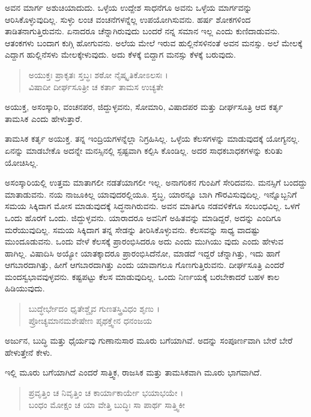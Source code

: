 ಅವನ ಮಾರ್ಗ ಅಶುಚಿಯಾದುದು. ಒಳ್ಳೆಯ ಉದ್ದೇಶ ಸಾಧನೆಗೂ ಅವನು ಒಳ್ಳೆಯ ಮಾರ್ಗವನ್ನು ಆರಿಸಿಕೊಳ್ಳುವುದಿಲ್ಲ. ಸುಳ್ಳು ಲಂಚ ವಂಚನೆಗಳನ್ನೆಲ್ಲ ಉಪಯೋಗಿಸುವನು. ಹರ್ಷ ಶೋಕಗಳಿಂದ ತಾಡಿತನಾಗುತ್ತಿರುವನು. ಏನಾದರೂ ಚೆನ್ನಾಗಿರುವುದು ಬಂದರೆ ನನ್ನ ಸಮಾನ ಇಲ್ಲ ಎಂದು ಕುಣಿದಾಡುವನು. ಆತಂಕಗಳು ಬಂದಾಗ ಕುಗ್ಗಿ ಹೋಗುವನು. ಅಲೆಯ ಮೇಲೆ ಇರುವ ಹುಲ್ಲಿನೆಸಳಿನಂತೆ ಅವನ ಮನಸ್ಸು. ಅಲೆ ಮೇಲಕ್ಕೆ ಎದ್ದಾಗ ಹುಲ್ಲಿನೆಸಳು ಮೇಲಕ್ಕೇಳುವುದು. ಅದು ಕೆಳಕ್ಕೆ ಬಿದ್ದಾಗ ಮನಸ್ಸು ಕೆಳಕ್ಕೆ ಬರುವುದು.

\begin{verse}
ಅಯುಕ್ತಃ ಪ್ರಾಕೃತಃ ಸ್ತಬ್ಧಃ ಶಠೋ ನೈಷ್ಕೃತಿಕೋಽಲಸಃ ।\\ವಿಷಾದೀ ದೀರ್ಘಸೂತ್ರೀ ಚ ಕರ್ತಾ ತಾಮಸ ಉಚ್ಯತೇ 
\end{verse}

{\small ಅಯುಕ್ತ, ಅಸಂಸ್ಕಾರಿ, ವಂಚನಪರ, ಜಿದ್ದುಳ್ಳವನು, ಸೋಮಾರಿ, ವಿಷಾದಪರ ಮತ್ತು ದೀರ್ಘಸೂತ್ರಿ ಆದ ಕರ್ತೃ ತಾಮಸಿಕ ಎಂದು ಹೇಳುತ್ತಾರೆ.}

ತಾಮಸಿಕ ಕರ್ತೃ ಅಯುಕ್ತ. ತನ್ನ ಇಂದ್ರಿಯಗಳನ್ನೆಲ್ಲಾ ನಿಗ್ರಹಿಸಿಲ್ಲ. ಒಳ್ಳೆಯ ಕೆಲಸಗಳನ್ನು ಮಾಡುವುದಕ್ಕೆ ಯೋಗ್ಯನಲ್ಲ. ಏನನ್ನು ಮಾಡಬೇಕೊ ಅದನ್ನೇ ಮನಸ್ಸಿನಲ್ಲಿ ಸ್ಪಷ್ಟವಾಗಿ ಕಲ್ಪಿಸಿ ಕೊಂಡಿಲ್ಲ. ಅದರ ಸಾಧಕಬಾಧಕಗಳನ್ನು ಕುರಿತು ಯೋಚಿಸಿಲ್ಲ.

ಅಸಂಸ್ಕಾರಿಯಲ್ಲಿ ಉತ್ತಮ ಮಾತಾಗಲೀ ನಡತೆಯಾಗಲೀ ಇಲ್ಲ. ಅನಾಗರಿಕನ ಗುಂಪಿಗೆ ಸೇರಿದವನು. ಮನಸ್ಸಿಗೆ ಬಂದದ್ದು ಮಾತಾಡುವನು. ನಯ ನಾಜೂಕಿಲ್ಲ ಯಾವುದರಲ್ಲಿಯೂ. ಸ್ತಬ್ಧ, ಯಾರನ್ನೂ ಬಾಗಿ ಗೌರವಿಸುವುದಿಲ್ಲ. ಇನ್ನೊಬ್ಬನಿಗೆ ಸಮಯ ಸಿಕ್ಕಿದಾಗ ಮೋಸ ಮಾಡುವುದಕ್ಕೆ ಸಿದ್ಧನಾಗಿರುವನು. ಅವನ ಮಾತಿಗೂ ನಡವಳಿಕೆಗೂ ಸಂಬಂಧವಿಲ್ಲ. ಒಳಗೆ ಒಂದು ಹೊರಗೆ ಒಂದು. ಜಿದ್ದುಳ್ಳವನು. ಯಾರಾದರೂ ಅವನಿಗೆ ಅಹಿತವನ್ನು ಮಾಡಿದ್ದರೆ, ಅದನ್ನು ಎಂದಿಗೂ ಮರೆಯುವುದಿಲ್ಲ. ಸಮಯ ಸಿಕ್ಕಿದಾಗ ತನ್ನ ಸೇಡನ್ನು ತೀರಿಸಿಕೊಳ್ಳುವನು. ಕೆಲಸವನ್ನು ಸಾಧ್ಯ ವಾದಷ್ಟು ಮುಂದೂಡುವನು. ಒಂದು ವೇಳೆ ಕೆಲಸಕ್ಕೆ ಪ್ರಾರಂಭಿಸಿದರೂ ಅದು ಎಂದು ಮುಗಿಯು ವುದು ಎಂದು ಹೇಳುವ ಹಾಗಿಲ್ಲ. ವಿಷಾದಿಸಿ ಅಯ್ಯೋ ಯಾತಕ್ಕಾದರೂ ಪ್ರಾರಂಭಿಸಿದೆನೋ, ಮಾಡದೆ ಇದ್ದರೆ ಚೆನ್ನಾಗಿತ್ತು, ಇದು ಹಾಗೆ ಆಗಬಾರದಾಗಿತ್ತು, ಹೀಗೆ ಆಗಬಾರದಾಗಿತ್ತು ಎಂದು ಯಾವಾಗಲೂ ಗೊಣಗುತ್ತಿರುವನು. ದೀರ್ಘಸೂತ್ರಿ ಎಂದರೆ ಮಂದಸ್ವಭಾವವುಳ್ಳವನು. ಕಷ್ಟಪಟ್ಟು ಕೆಲಸ ಮಾಡುವುದಿಲ್ಲ. ಒಂದು ನಿರ್ಣಯಕ್ಕೆ ಬರಬೇಕಾದರೆ ಬಹಳ ಕಾಲ ಹಿಡಿಯುವುದು.

\begin{verse}
ಬುದ್ಧೇರ್ಭೇದಂ ಧೃತೇಶ್ಚೈವ ಗುಣತಸ್ತ್ರಿವಿಧಂ ಶೃಣು ।\\ಪ್ರೋಚ್ಯಮಾನಮಶೇಷೇಣ ಪೃಥಕ್ತ್ವೇನ ಧನಂಜಯ 
\end{verse}

{\small ಅರ್ಜುನ, ಬುದ್ಧಿ ಮತ್ತು ಧೈರ್ಯವು ಗುಣಾನುಸಾರ ಮೂರು ಬಗೆಯಾಗಿವೆ. ಅದನ್ನು ಸಂಪೂರ್ಣವಾಗಿ ಬೇರೆ ಬೇರೆ ಹೇಳುತ್ತೇನೆ ಕೇಳು.}

ಇಲ್ಲಿ ಮೂರು ಬಗೆಯಾಗಿದೆ ಎಂದರೆ ಸಾತ್ತ್ವಿಕ, ರಾಜಸಿಕ ಮತ್ತು ತಾಮಸಿಕವಾಗಿ ಮೂರು ಭಾಗವಾಗಿದೆ.

\begin{verse}
ಪ್ರವೃತ್ತಿಂ ಚ ನಿವೃತ್ತಿಂ ಚ ಕಾರ್ಯಾಕಾರ್ಯೇ ಭಯಾಭಯೇ ।\\ಬಂಧಂ ಮೋಕ್ಷಂ ಚ ಯಾ ವೇತ್ತಿ ಬುದ್ಧಿಃ ಸಾ ಪಾರ್ಥ ಸಾತ್ತ್ವಿಕೀ 
\end{verse}

